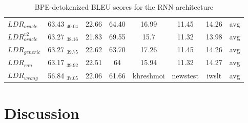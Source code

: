 \documentclass[11pt,a4paper]{article}
\begin{document}
\begin{table}[!h]
\begin{center}
{\begin{tabular}{|l|ccc|ccc||c|}
\hline
$LDR_{oracle}$   & 63.43 $_{40.04}$ & 22.66 & 64.40 & 16.99 & 11.45 & 14.26 & avg\\
$LDR^{v2}_{oracle}$   & 63.27 $_{38.16}$ & 21.83 & 69.55 & 15.7 & 11.32 & 13.98 & avg\\
$LDR_{generic}$ & 63.27 $_{39.75}$ & 22.62 & 63.70 & 17.26 & 11.45 & 14.26 & avg\\
$LDR_{rnn}$        & 63.17 $_{39.92}$ & 22.51 & 64 & 15.94 & 11.32 & 14.27 & avg\\
$LDR_{wrong}$   & 56.84 $_{37.05}$ & 22.06 & 61.66 & khreshmoi & newstest & iwslt & avg \\
\hline
\end{tabular}
} %
\end{center}
\caption{BPE-detokenized BLEU scores for the RNN architecture \label{tab:results-rnn}}
\end{table}

\section{Discussion\label{sec:Discussion}}
\end{document}
